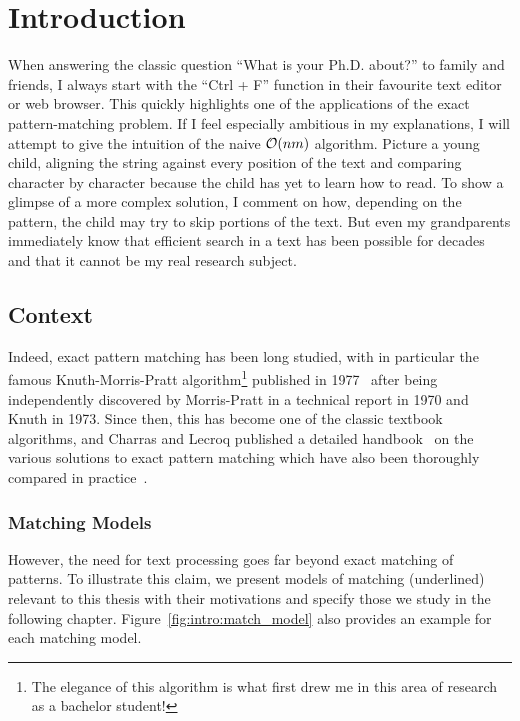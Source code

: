 \chapter*{Introduction}\label{chap:intro}\setcounter{page}{1}\frontmatter
{}

When answering the classic question ``What is your Ph.D. about?'' to family and friends, I always start with the ``Ctrl + F'' function in their favourite text editor or web browser. This quickly highlights one of the applications of the exact pattern-matching problem. If I feel especially ambitious in my explanations, I will attempt to give the intuition of the naive $\mathcal{O}(nm)$ algorithm. Picture a young child, aligning the string against every position of the text and comparing character by character because the child has yet to learn how to read. To show a glimpse of a more complex solution, I comment on how, depending on the pattern, the child may try to skip portions of the text. But even my grandparents immediately know that efficient search in a text has been possible for decades and that it cannot be my real research subject.

\section{Context}

Indeed, exact pattern matching has been long studied, with in particular the famous Knuth-Morris-Pratt algorithm\footnote{The elegance of this algorithm is what first drew me in this area of research as a bachelor student!} published in 1977~\cite{KMP} after being independently discovered by Morris-Pratt in a technical report in 1970 and Knuth in 1973. Since then, this has become one of the classic textbook algorithms, and Charras and Lecroq published a detailed handbook~\cite{charras2004handbook} on the various solutions to exact pattern matching which have also been thoroughly compared in practice~\cite{DBLP:journals/corr/abs-1012-2547, faro2013exact}.

\subsection{Matching Models}\label{sec:intro:complex}



However, the need for text processing goes far beyond exact matching of patterns. To illustrate this claim, we present models of matching (underlined) relevant to this thesis with their motivations and specify those we study in the following chapter. Figure~\ref{fig:intro:match_model} also provides an example for each matching model.

